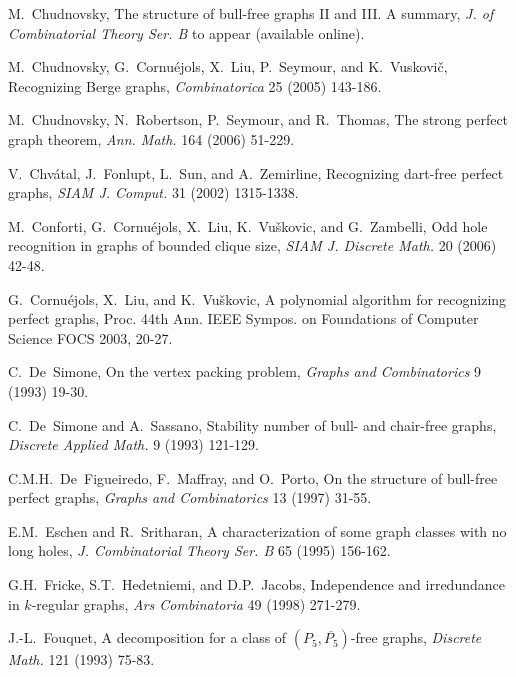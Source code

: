 \documentclass[11pt]{article}
\newcommand{\0}{\text{ has a co-join to }}
\newcommand{\1}{\text{ has a join to }}
\begin{document}
\begin{footnotesize}
\begin{thebibliography}{99}
    M.~Chudnovsky, 
    The structure of bull-free graphs II and III. A summary, 
    {\sl J. of Combinatorial Theory Ser. B} to appear (available online).

    M.~Chudnovsky, G.~Cornu\'ejols, X.~Liu, P.~Seymour, and K.~Vuskovi\v c,
    Recognizing Berge graphs, 
    {\sl Combinatorica} 25 (2005) 143-186.

    M.~Chudnovsky, N.~Robertson, P.~Seymour, and R.~Thomas,
    The strong perfect graph theorem, 
    {\sl Ann. Math.} 164 (2006) 51-229.

    V.~Chv\'atal, J.~Fonlupt, L.~Sun, and A.~Zemirline,
    Recognizing dart-free perfect graphs,
    {\sl SIAM J. Comput.} 31 (2002) 1315-1338.

    M.~Conforti, G.~Cornu\'ejols, X.~Liu, K.~Vu\v skovic, and G.~Zambelli,
    Odd hole recognition in graphs of bounded clique size,
    {\sl SIAM J. Discrete Math.} 20 (2006) 42-48.

    G.~Cornu\'ejols, X.~Liu, and K.~Vu\v skovic,
    A polynomial algorithm for recognizing perfect graphs,
    Proc. 44th Ann. IEEE Sympos. on Foundations of Computer Science FOCS 2003, 20-27.

    C.~De~Simone,
    On the vertex packing problem,
    {\sl Graphs and Combinatorics} 9 (1993) 19-30.

    C.~De~Simone and A.~Sassano,  
    Stability number of bull- and chair-free graphs,
    {\sl Discrete Applied Math.} 9 (1993) 121-129.

    C.M.H.~De~Figueiredo, F.~Maffray, and O.~Porto,
    On the structure of bull-free perfect graphs,
    {\sl Graphs and Combinatorics} 13 (1997) 31-55.

    E.M.~Eschen and R.~Sritharan,
    A characterization of some graph classes with no long holes,
    {\sl J. Combinatorial Theory Ser. B} 65 (1995) 156-162.

    G.H.~Fricke, S.T.~Hedetniemi, and D.P.~Jacobs,
    Independence and irredundance in $k$-regular graphs,
    {\sl Ars Combinatoria} 49 (1998) 271-279.

    J.-L.~Fouquet,
    A decomposition for a class of $(P_5,\overline{P_5})$-free graphs,
    {\sl Discrete Math.} 121 (1993) 75-83.





\end{thebibliography}
\end{footnotesize}
\end{document}
